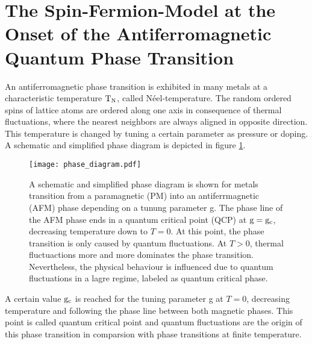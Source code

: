 \section{The Spin-Fermion-Model at the Onset of the Antiferromagnetic Quantum Phase Transition}
\label{sec:spin-fermion-model}
%
%
An antiferromagnetic phase transition is exhibited in many metals at a characteristic temperature $\mathrm{T}_{\mathrm{N}}$, called N\'eel-temperature.
The random ordered spins of lattice atoms are ordered along one axis in consequence of thermal fluctuations, where the nearest neighbors are always aligned in opposite direction.
This temperature is changed by tuning a certain parameter as pressure or doping.
A schematic and simplified phase diagram is depicted in figure \ref{fig:phase diagram}.
%
\begin{figure}[t]
	\centering
	\texttt{[image: phase\_diagram.pdf]}
	\caption{
A schematic and simplified phase diagram is shown for metals transition from a paramagnetic (PM) into an antiferrmagnetic (AFM) phase depending on a tunung parameter g.
The phase line of the AFM phase ends in a quantum critical point (QCP) at $\mathrm{g} = \mathrm{g}_{\mathrm{c}}$, decreasing temperature down to $T = 0$.
At this point, the phase transition is only caused by quantum fluctuations.
At $T > 0$, thermal fluctuactions more and more dominates the phase transition.
Nevertheless, the physical behaviour is influenced due to quantum fluctuations in a lagre regime, labeled as quantum critical phase.
	}
	\label{fig:phase diagram}
\end{figure}
%
A certain value $\mathrm{g}_{\mathrm{c}}$ is reached for the tuning parameter g at $T = 0$, decreasing temperature and following the phase line between both magnetic phases.
This point is called quantum critical point and quantum fluctuations are the origin of this phase transition in comparsion with phase transitions at finite temperature.

